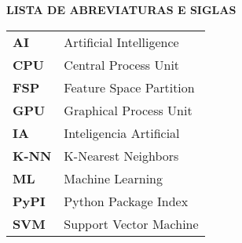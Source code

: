 \thispagestyle{empty}
\begin{center}
\textbf{\uppercase{Lista de Abreviaturas e Siglas}}
\end{center}
\vspace{0.5cm}
\begin{spacing}{2}

\begin{tabular}{ l l }
\textbf{AI}&Artificial Intelligence\\
\textbf{CPU}&Central Process Unit\\
\textbf{FSP}&Feature Space Partition\\
\textbf{GPU}&Graphical Process Unit\\
\textbf{IA}&Inteligencia Artificial\\
\textbf{K-NN}&K-Nearest Neighbors\\
\textbf{ML}&Machine Learning\\
\textbf{PyPI}&Python Package Index\\
\textbf{SVM}&Support Vector Machine\\
\end{tabular}

\end{spacing}
\newpage